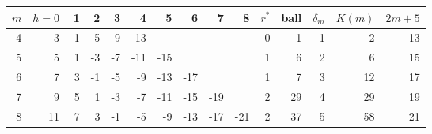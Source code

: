\begin{tabular}{rrrrrrrrrr|rrrrr}
\toprule
$m$ & $h{=}0$ & 1 & 2 & 3 & 4 & 5 & 6 & 7 & 8 & $r^\ast$ & ball & $\delta_m$ & $K(m)$ & $2m+5$\\
\midrule
4 & 3 & -1 & -5 & -9 & -13 &  &  &  &  & 0 & 1 & 1 & 2 & 13\\
5 & 5 & 1 & -3 & -7 & -11 & -15 &  &  &  & 1 & 6 & 2 & 6 & 15\\
6 & 7 & 3 & -1 & -5 & -9 & -13 & -17 &  &  & 1 & 7 & 3 & 12 & 17\\
7 & 9 & 5 & 1 & -3 & -7 & -11 & -15 & -19 &  & 2 & 29 & 4 & 29 & 19\\
8 & 11 & 7 & 3 & -1 & -5 & -9 & -13 & -17 & -21 & 2 & 37 & 5 & 58 & 21\\
\bottomrule
\end{tabular}
